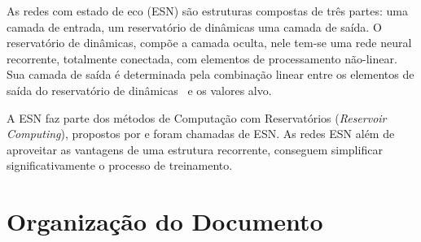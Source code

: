 
As redes com estado de eco (ESN) são estruturas compostas de três partes: uma camada de entrada, um reservatório de dinâmicas uma camada de saída. O reservatório de dinâmicas, compõe a camada oculta, nele tem-se uma rede neural recorrente, totalmente conectada, com elementos de processamento não-linear. Sua camada de saída é determinada pela combinação linear entre os elementos de saída do reservatório de dinâmicas~\cite{jaeger2005, thesis:boccato2013, thesis:simeon2015} e os valores alvo.

A ESN faz parte dos métodos de Computação com Reservatórios (\textit{Reservoir Computing}), propostos por  e foram chamadas de ESN. As redes ESN além de aproveitar
as vantagens de uma estrutura recorrente, conseguem simplificar significativamente o
processo de treinamento.






\section{Organização do Documento}

